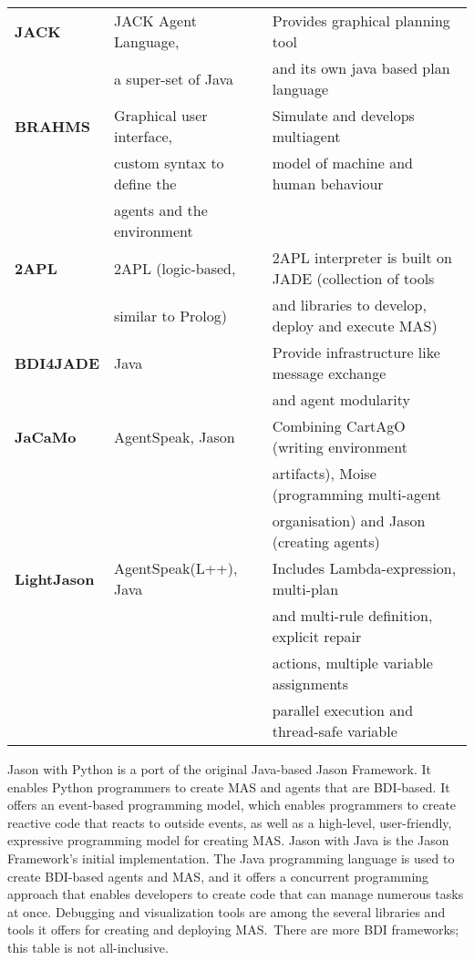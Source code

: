 \begin{table}[h]
{\begin{tabular}{|l| l| l|}
\textbf{JACK} &	JACK Agent Language,  &	Provides graphical planning tool\\ 
& a super-set of Java & and its own java based plan language \\ \hline

\textbf{BRAHMS} & Graphical user interface, &	Simulate and develops multiagent  \\
& custom syntax to define the  &  model of machine and human behaviour\\
& agents and the environment & \\ \hline

\textbf{2APL} & 2APL (logic-based, & 2APL interpreter is built on JADE  (collection of tools\\ 
 & similar to Prolog) &   and libraries to develop, deploy and execute \ac{MAS})\\ \hline

\textbf{BDI4JADE} & Java & Provide infrastructure like message exchange\\
& & and agent modularity \\ \hline

\textbf{JaCaMo} & AgentSpeak, Jason & Combining CartAgO (writing environment \\
& & artifacts), Moise (programming multi-agent  \\
& & organisation) and Jason (creating agents) \\ \hline
\textbf{LightJason} & AgentSpeak(L++), Java & Includes Lambda-expression, multi-plan \\
& &  and multi-rule definition, explicit repair \\
& & actions, multiple variable assignments  \\
& & parallel execution and thread-safe variable \\ \hline
\hline 
\end{tabular}}
\end{table}

\vspace{.5cm}

Jason with Python is a port of the original Java-based Jason Framework. It enables Python programmers to create \ac{MAS} and agents that are \ac{BDI}-based. It offers an event-based programming model, which enables programmers to create reactive code that reacts to outside events, as well as a high-level, user-friendly, expressive programming model for creating \ac{MAS}. Jason with Java is the Jason Framework's initial implementation. The Java programming language is used to create \ac{BDI}-based agents and \ac{MAS}, and it offers a concurrent programming approach that enables developers to create code that can manage numerous tasks at once. Debugging and visualization tools are among the several libraries and tools it offers for creating and deploying \ac{MAS}. There are more \ac{BDI} frameworks; this table is not all-inclusive.

